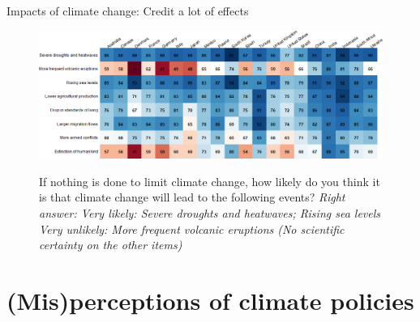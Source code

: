 \begin{frame}{Impacts of climate change: Credit a lot of effects}%
	\begin{figure}[h!]
	\centering
	\caption{If nothing is done to limit climate change, how likely do you think it is that climate change will lead to the following events?
	\newline\footnotesize{\textit{Right answer: Very likely: Severe droughts and heatwaves; Rising sea levels \\ \quad \quad \quad \quad \quad \quad Very unlikely: More frequent volcanic eruptions (No scientific certainty on the other items)}}}
	\includegraphics[width=\textwidth]{../figures/country_comparison/CC_impacts_positive_countries.png} \\
	\end{figure}
\end{frame}

\section{(Mis)perceptions of climate policies}

